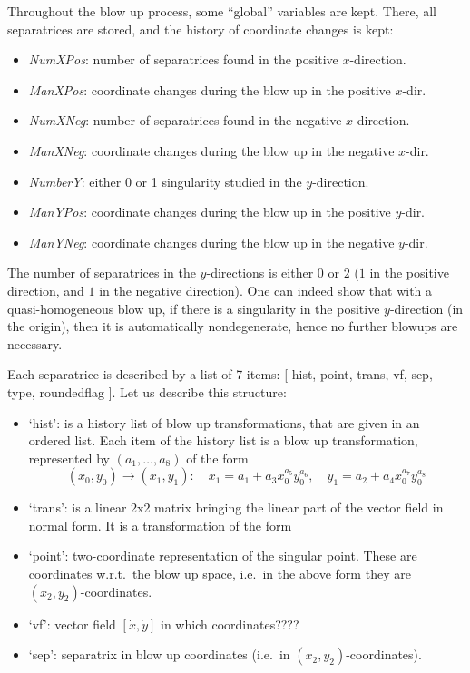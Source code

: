 \documentclass[a4paper,10pt]{article}
\begin{document}
Throughout the blow up process, some ``global'' variables are kept.  There, all separatrices are stored,
and the history of coordinate changes is kept:
\begin{itemize}
\item {\sl NumXPos}: number of separatrices found in the positive $x$-direction.
\item {\sl ManXPos}: coordinate changes during the blow up in the positive $x$-dir.
\item {\sl NumXNeg}: number of separatrices found in the negative $x$-direction.
\item {\sl ManXNeg}: coordinate changes during the blow up in the negative $x$-dir.
\item {\sl NumberY}: either 0 or 1 singularity studied in the $y$-direction.
\item {\sl ManYPos}: coordinate changes during the blow up in the positive $y$-dir.
\item {\sl ManYNeg}: coordinate changes during the blow up in the negative $y$-dir.
\end{itemize}

The number of separatrices in the $y$-directions is either $0$ or $2$ ($1$ in the positive direction, and
$1$ in the negative direction).  One can indeed show that with a quasi-homogeneous blow up, if there is
a singularity in the positive $y$-direction (in the origin), then it is automatically nondegenerate, hence
no further blowups are necessary.
\smallskip

Each separatrice is described by a list of 7 items: [ hist, point, trans, vf, sep, type, roundedflag ].
Let us describe this structure:

\begin{itemize}
\item   `hist': is a history list of blow up transformations, that are given in an ordered list.
        Each item of the history list is a blow up transformation, represented by $(a_1,\dots,a_8)$ of the form
        \[
            (x_0,y_0)\to (x_1,y_1)\colon\quad
            x_1 = a_1 + a_3x_0^{a_5}y_0^{a_6},\quad
            y_1 = a_2 + a_4x_0^{a_7}y_0^{a_8}
        \]
\item
        `trans': is a linear 2x2 matrix bringing the linear part of the vector field in normal form.  It is
        a transformation of the form
\item
        `point': two-coordinate representation of the singular point.  These are coordinates w.r.t.~the blow up
        space, i.e.~in the above form they are $(x_2,y_2)$-coordinates.
\item
        `vf': vector field $[\dot{x},\dot{y}]$ in which coordinates????
\item
        `sep': separatrix in blow up coordinates (i.e.~in $(x_2,y_2)$-coordinates).
\end{itemize}
\end{document}
